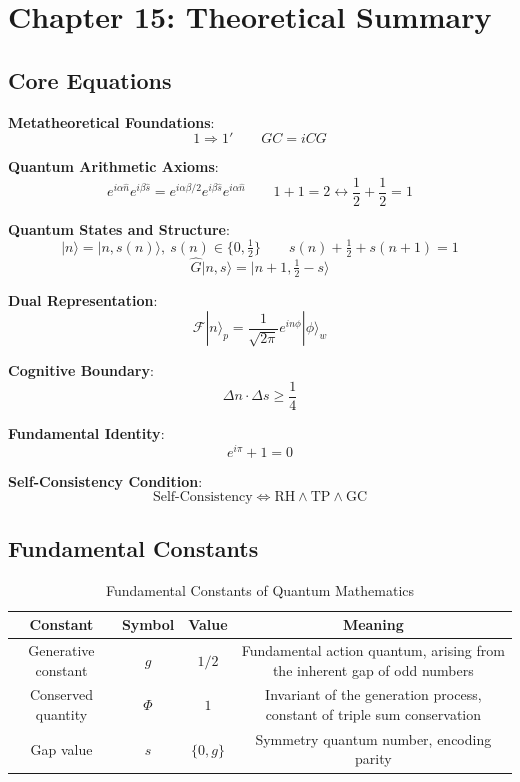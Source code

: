 \documentclass[12pt]{article}
\theoremstyle{definition}
\begin{document}
\section{Chapter 15: Theoretical Summary}

\subsection{Core Equations}

\textbf{Metatheoretical Foundations}:
\[
\boxed{1 \Rightarrow 1'} \qquad \boxed{GC = iCG}
\]

\textbf{Quantum Arithmetic Axioms}:
\[
\boxed{e^{i\alpha\hat{n}} e^{i\beta\hat{s}} = e^{i\alpha\beta/2} e^{i\beta\hat{s}} e^{i\alpha\hat{n}}} \qquad \boxed{1+1=2 \longleftrightarrow \frac12 + \frac12 = 1}
\]

\textbf{Quantum States and Structure}:
\[
\boxed{|n\rangle = |n,s(n)\rangle,\ s(n) \in \{0,\tfrac12\}} \qquad \boxed{s(n) + \tfrac12 + s(n+1) = 1}
\]
\[
\boxed{\hat{G}|n,s\rangle = |n+1, \tfrac12 - s\rangle}
\]

\textbf{Dual Representation}:
\[
\boxed{\mathcal{F}|n\rangle_p = \frac{1}{\sqrt{2\pi}} e^{in\phi}|\phi\rangle_w}
\]

\textbf{Cognitive Boundary}:
\[
\boxed{\Delta n \cdot \Delta s \geq \frac14}
\]

\textbf{Fundamental Identity}:
\[
\boxed{e^{i\pi} + 1 = 0}
\]

\textbf{Self-Consistency Condition}:
\[
\boxed{\text{Self-Consistency} \iff \text{RH} \land \text{TP} \land \text{GC}}
\]

\subsection{Fundamental Constants}

\begin{table}[h]
\centering
\caption{Fundamental Constants of Quantum Mathematics}
\begin{tabular}{|c|c|c|c|}
\hline
\textbf{Constant} & \textbf{Symbol} & \textbf{Value} & \textbf{Meaning} \\
\hline
Generative constant & \(g\) & \(1/2\) & Fundamental action quantum, arising from the inherent gap of odd numbers \\
Conserved quantity & \(\Phi\) & \(1\) & Invariant of the generation process, constant of triple sum conservation \\
Gap value & \(s\) & \(\{0, g\}\) & Symmetry quantum number, encoding parity \\
\hline
\end{tabular}
\end{table}
\end{document}
